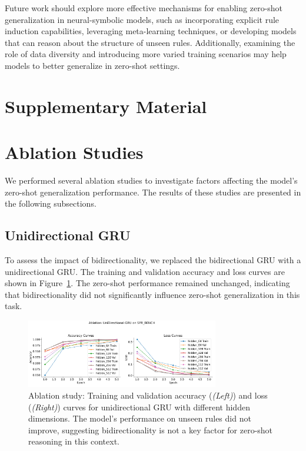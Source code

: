 \documentclass{article} %
\newcommand{\figleft}{{\em (Left)\/}}
\newcommand{\figright}{{\em (Right)\/}}
\theoremstyle{plain}
\begin{document}
Future work should explore more effective mechanisms for enabling zero-shot generalization in neural-symbolic models, such as incorporating explicit rule induction capabilities, leveraging meta-learning techniques, or developing models that can reason about the structure of unseen rules. Additionally, examining the role of data diversity and introducing more varied training scenarios may help models to better generalize in zero-shot settings.




\appendix

\section*{\LARGE Supplementary Material}
\label{sec:appendix}

\section{Ablation Studies}
\label{sec:ablation_studies}

We performed several ablation studies to investigate factors affecting the model's zero-shot generalization performance. The results of these studies are presented in the following subsections.

\subsection{Unidirectional GRU}

To assess the impact of bidirectionality, we replaced the bidirectional GRU with a unidirectional GRU. The training and validation accuracy and loss curves are shown in Figure~\ref{fig:ablation_unidir_gru}. The zero-shot performance remained unchanged, indicating that bidirectionality did not significantly influence zero-shot generalization in this task.

\begin{figure}[h!]
\centering
\includegraphics[width=0.75\textwidth]{Ablation_UniDirectional_GRU.png}
\caption{Ablation study: Training and validation accuracy (\figleft) and loss (\figright) curves for unidirectional GRU with different hidden dimensions. The model's performance on unseen rules did not improve, suggesting bidirectionality is not a key factor for zero-shot reasoning in this context.}
\label{fig:ablation_unidir_gru}
\end{figure}
\end{document}
